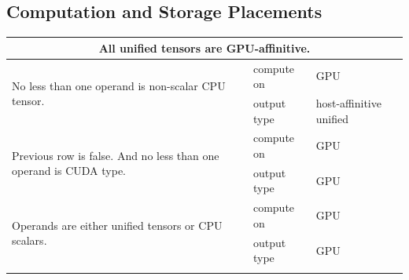 \subsection{Computation and Storage Placements}
\label{sec:placement_rules}
\begin{table}[!htbp]
\begin{subtable}[]{\textwidth}\centering
\begin{tabular}{lll}
\toprule
\multicolumn{3}{c}{All unified tensors are GPU-affinitive.}        \\
\midrule
\multirow{2}{6.2cm}{No less than one operand is non-scalar CPU tensor.}   & \multicolumn{1}{l|}{compute on} & GPU  \\
 & \multicolumn{1}{l|}{output type}& host-affinitive unified \\
\hline
\multirow{2}{6.2cm}{Previous row is false. And no less than one operand is CUDA type.}  & \multicolumn{1}{l|}{compute on} & GPU  \\%
 & \multicolumn{1}{l|}{output type}& GPU   \\
\hline
\multirow{2}{6.2cm}{Operands are either unified tensors or CPU scalars.}   & \multicolumn{1}{l|}{compute on} & GPU  \\%
 & \multicolumn{1}{l|}{output type} & GPU   \\
\bottomrule
\vspace{0.05em}
\end{tabular}
\end{subtable}


\end{table}
